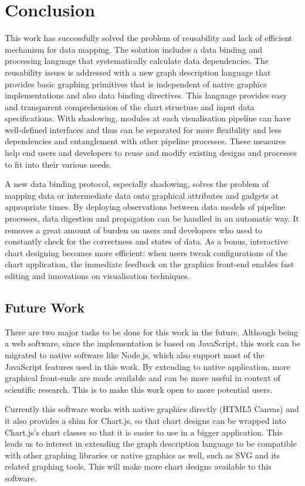 \documentclass[11pt, a4paper]{report}
\begin{document}
\chapter{Conclusion}
This work has successfully solved the problem of reusability and lack of efficient mechanism for data mapping. The solution includes a data binding and processing language that systematically calculate data dependencies. The reusability issues is addressed with a new graph description language that provides basic graphing primitives that is independent of native graphics implementations and also data binding directives. This language provides easy and transparent comprehension of the chart structure and input data specifications. With shadowing, modules at each visualisation pipeline can have well-defined interfaces and thus can be separated for more flexibility and less dependencies and entanglement with other pipeline processes. These measures help end users and developers to reuse and modify existing designs and processes to fit into their various needs.

A new data binding protocol, especially shadowing, solves the problem of mapping data or intermediate data onto graphical attributes and gadgets at appropriate times. By deploying observations between data models of pipeline processes, data digestion and propagation can be handled in an automatic way. It removes a great amount of burden on users and developers who used to constantly check for the correctness and states of data. As a bonus, interactive chart designing becomes more efficient: when users tweak configurations of the chart application, the immediate feedback on the graphics front-end enables fast editing and innovations on visualisation techniques.

\section{Future Work}
There are two major tasks to be done for this work in the future. Although being a web software, since the implementation is based on JavaScript, this work can be migrated to native software like Node.js, which also support most of the JavaScript features used in this work. By extending to native application, more graphical front-ends are made available and can be more useful in context of scientific research. This is to make this work open to more potential users.

Currently this software works with native graphics directly (HTML5 Canvas) and it also provides a shim for Chart.js, so that chart designs can be wrapped into Chart.js's chart classes so that it is easier to use in a bigger application. This leads us to interest in extending the graph description language to be compatible with other graphing libraries or native graphics as well, such as SVG and its related graphing tools. This will make more chart designs available to this software.
\end{document}
